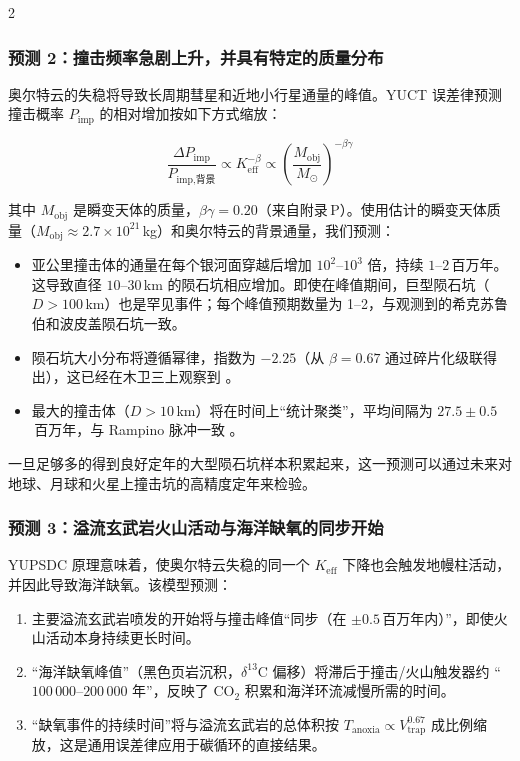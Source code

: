 \documentclass[11pt,a4paper]{article}
\begin{document}
\begin{multicols}{2}
		\subsubsection{预测 2：撞击频率急剧上升，并具有特定的质量分布}
		
		奥尔特云的失稳将导致长周期彗星和近地小行星通量的峰值。YUCT 误差律预测撞击概率 \(P_{\text{imp}}\) 的相对增加按如下方式缩放：
		
		\[
		\frac{\Delta P_{\text{imp}}}{P_{\text{imp,背景}}} \propto K_{\mathrm{eff}}^{-\beta} \propto \left(\frac{M_{\text{obj}}}{M_{\odot}}\right)^{-\beta\gamma}
		\]
		
		其中 \(M_{\text{obj}}\) 是瞬变天体的质量，\(\beta\gamma = 0.20\)（来自附录 P）。使用估计的瞬变天体质量（\(M_{\text{obj}} \approx 2.7\times10^{21}\) kg）和奥尔特云的背景通量，我们预测：
		
		\begin{itemize}
			\item 亚公里撞击体的通量在每个银河面穿越后增加 \(10^{2}\)–\(10^{3}\) 倍，持续 \(1\)–\(2\) 百万年。这导致直径 \(10\)–\(30\) km 的陨石坑相应增加。即使在峰值期间，巨型陨石坑（\(D>100\) km）也是罕见事件；每个峰值预期数量为 1–2，与观测到的希克苏鲁伯和波皮盖陨石坑一致。
			\item 陨石坑大小分布将遵循幂律，指数为 \(-2.25\)（从 \(\beta=0.67\) 通过碎片化级联得出），这已经在木卫三上观察到 \cite{Schenk2004}。
			\item 最大的撞击体（\(D>10\) km）将在时间上“统计聚类”，平均间隔为 \(27.5 \pm 0.5\) 百万年，与 Rampino 脉冲一致 \cite{Rampino2021}。
		\end{itemize}
		
		一旦足够多的得到良好定年的大型陨石坑样本积累起来，这一预测可以通过未来对地球、月球和火星上撞击坑的高精度定年来检验。
		
			
		\subsubsection{预测 3：溢流玄武岩火山活动与海洋缺氧的同步开始}
		
		YUPSDC 原理意味着，使奥尔特云失稳的同一个 \(K_{\mathrm{eff}}\) 下降也会触发地幔柱活动，并因此导致海洋缺氧。该模型预测：
		
		\begin{enumerate}
			\item 主要溢流玄武岩喷发的开始将与撞击峰值“同步（在 \(\pm 0.5\) 百万年内）”，即使火山活动本身持续更长时间。
			\item “海洋缺氧峰值”（黑色页岩沉积，\(\delta^{13}\)C 偏移）将滞后于撞击/火山触发器约 “\(100\,000\)–\(200\,000\) 年”，反映了 CO\(_2\) 积累和海洋环流减慢所需的时间。
			\item “缺氧事件的持续时间”将与溢流玄武岩的总体积按 \(T_{\text{anoxia}} \propto V_{\text{trap}}^{0.67}\) 成比例缩放，这是通用误差律应用于碳循环的直接结果。
		\end{enumerate}
		

\end{multicols}
\end{document}
